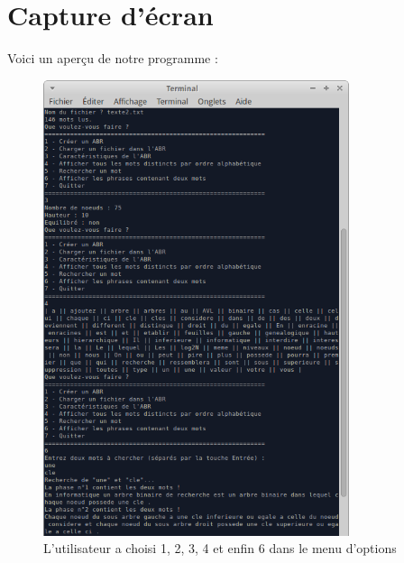 \chapter{Capture d'écran}
\noindent Voici un aperçu de notre programme :
\begin{figure}[!h]
   \centering\includegraphics[width=0.8\textwidth]{sample.png}
   \caption{L'utilisateur a choisi 1, 2, 3, 4 et enfin 6 dans le menu d'options}
\end{figure}